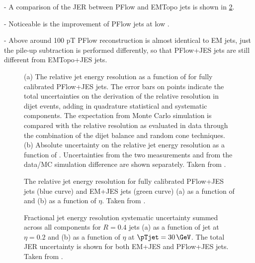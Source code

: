 - A comparison of the JER between PFlow and EMTopo jets is shown in \cref{fig:jer-combination-results}.

- Noticeable is the improvement of PFlow jets at low \pT.

- Above around 100 pT PFlow reconstruction is almost identical to EM jets, just the pile-up subtraction is performed differently, so that PFlow+JES jets are still different from EMTopo+JES jets.



\FloatBarrier
\begin{figure}
    \caption{(a) The relative jet energy resolution as a function of \pT for fully calibrated PFlow+JES jets. The error bars on points indicate the total uncertainties on the derivation of the relative resolution in dijet events, adding in quadrature statistical and systematic components. The expectation from Monte Carlo simulation is compared with the relative resolution as evaluated in data through the combination of the dijet balance and random cone techniques. (b) Absolute uncertainty on the relative jet energy resolution as a function of \pTjet. Uncertainties from the two \insitu measurements and from the data/MC simulation difference are shown separately. Taken from .}
    \label{fig:jer-combination-incl-noise-term}
\end{figure}



\begin{figure}
    \caption{The relative jet energy resolution for fully calibrated PFlow+JES jets (blue curve) and EM+JES jets (green curve) (a) as a function of \pTjet and (b) as a function of $\eta$. Taken from .}
    \label{fig:jer-combination-results}
\end{figure}



\FloatBarrier
\begin{figure}[t]
    \caption{Fractional jet energy resolution systematic uncertainty summed across all components for \antikt $R = 0.4$ jets (a) as a function of jet \pTjet at $\eta = 0.2$ and (b) as a function of $\eta$ at $\pTjet = 30\,\GeV$. The total JER uncertainty is shown for both EM+JES and PFlow+JES jets. Taken from .}
    \label{fig:jer-combination-uncertainties}
\end{figure}



